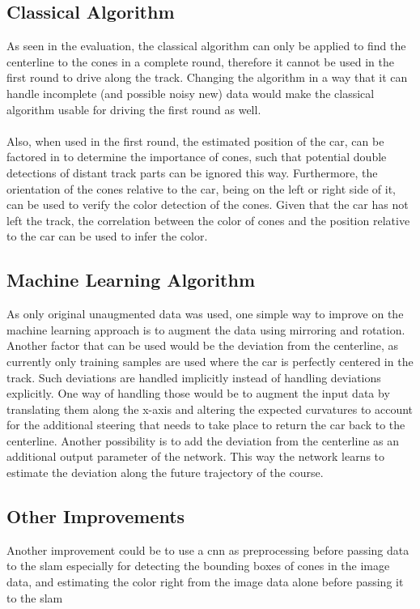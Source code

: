 \subsection{Classical Algorithm}
As seen in the evaluation, the classical algorithm can only be applied to find the centerline to the cones in a complete round, therefore it cannot be used in the first round to drive along the track. Changing the algorithm in a way that it can handle incomplete (and possible noisy new) data would make the classical algorithm usable for driving the first round as well. \\
\\Also, when used in the first round, the estimated position of the car, can be factored in to determine the importance of cones, such that potential double detections of distant track parts can be ignored this way. Furthermore, the orientation of the cones relative to the car, being on the left or right side of it, can be used to verify the color detection of the cones. Given that the car has not left the track, the correlation between the color of cones and the position relative to the car can be used to infer the color.
\subsection{Machine Learning Algorithm}
As  only original unaugmented data was used, one simple way to improve on the machine learning approach is to augment the data using mirroring and rotation. Another factor that can be used would be the deviation from the centerline, as currently only training samples are used where the car is perfectly centered in the track. Such deviations are handled implicitly instead of handling deviations explicitly. One way of handling those would be to augment the input data by translating them along the x-axis and altering the expected curvatures to account for the additional steering that needs to take place to return the car back to the centerline. Another possibility is to add the deviation from the centerline as an additional output parameter of the network. This way the network learns to estimate the deviation along the future trajectory of the course.
\subsection{Other Improvements}
Another improvement could be to use a \ac{cnn} as preprocessing before passing data to the \ac{slam} especially for detecting the bounding boxes of cones in the image data, and estimating the color right from the image data alone before passing it to the slam
